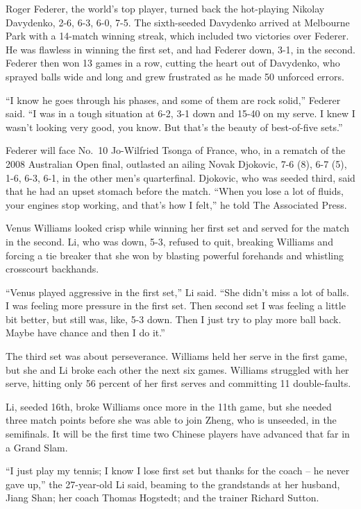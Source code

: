 ﻿\documentclass[12pt]{article}
\begin{document}
Roger Federer, the world's top player, turned back the hot-playing Nikolay Davydenko, 2-6, 6-3, 6-0,
7-5. The sixth-seeded Davydenko arrived at Melbourne Park with a 14-match winning streak, which
included two victories over Federer. He was flawless in winning the first set, and had Federer down,
3-1, in the second. Federer then won 13 games in a row, cutting the heart out of Davydenko, who
sprayed balls wide and long and grew frustrated as he made 50 unforced errors.

``I know he goes through his phases, and some of them are rock solid,'' Federer said. ``I was in a
tough situation at 6-2, 3-1 down and 15-40 on my serve. I knew I wasn't looking very good, you know.
But that's the beauty of best-of-five sets.''

Federer will face No.~10 Jo-Wilfried Tsonga of France, who, in a rematch of the 2008 Australian Open
final, outlasted an ailing Novak Djokovic, 7-6 (8), 6-7 (5), 1-6, 6-3, 6-1, in the other men's
quarterfinal. Djokovic, who was seeded third, said that he had an upset stomach before the match.
``When you lose a lot of fluids, your engines stop working, and that's how I felt,'' he told The
Associated Press.

Venus Williams looked crisp while winning her first set and served for the match in the second. Li,
who was down, 5-3, refused to quit, breaking Williams and forcing a tie breaker that she won by
blasting powerful forehands and whistling crosscourt backhands.

``Venus played aggressive in the first set,'' Li said. ``She didn't miss a lot of balls. I was
feeling more pressure in the first set. Then second set I was feeling a little bit better, but still
was, like, 5-3 down. Then I just try to play more ball back. Maybe have chance and then I do it.''

The third set was about perseverance. Williams held her serve in the first game, but she and Li
broke each other the next six games. Williams struggled with her serve, hitting only 56 percent of
her first serves and committing 11 double-faults.

Li, seeded 16th, broke Williams once more in the 11th game, but she needed three match points before
she was able to join Zheng, who is unseeded, in the semifinals. It will be the first time two
Chinese players have advanced that far in a Grand Slam.

``I just play my tennis; I know I lose first set but thanks for the coach -- he never gave up,'' the
27-year-old Li said, beaming to the grandstands at her husband, Jiang Shan; her coach Thomas
Hogstedt; and the trainer Richard Sutton.
\end{document}
